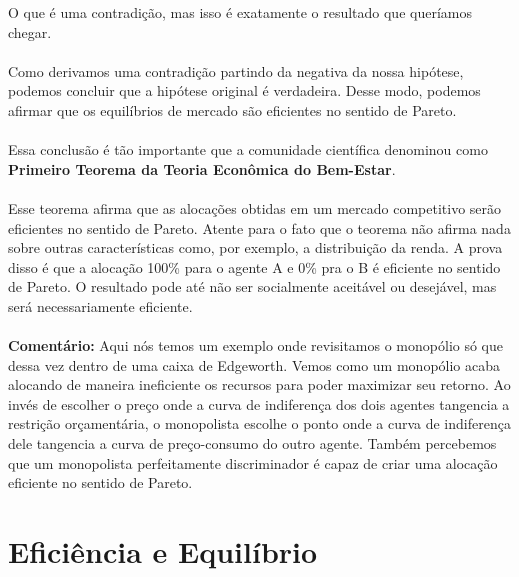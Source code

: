 \documentclass[a4paper,11pt,oneside]{book}
\theoremstyle{definition}
\theoremstyle{break}
\begin{document}
O que é uma contradição, mas isso é exatamente o resultado que queríamos chegar.
\\
\\
Como derivamos uma contradição partindo da negativa da nossa hipótese, podemos concluir que a hipótese original é verdadeira. Desse modo, podemos afirmar que os equilíbrios de mercado são eficientes no sentido de Pareto.
\\
\\
Essa conclusão é tão importante que a comunidade científica denominou como \textbf{Primeiro Teorema da Teoria Econômica do Bem-Estar}.
\\
\\
Esse teorema afirma que as alocações obtidas em um mercado competitivo serão eficientes no sentido de Pareto. Atente para o fato que o teorema não afirma nada sobre outras características como, por exemplo, a distribuição da renda. A prova disso é que a alocação 100\% para o agente A e 0\% pra o B é eficiente no sentido de Pareto. O resultado pode até não ser socialmente aceitável ou desejável, mas será necessariamente eficiente.
\\
\\
\textbf{Comentário:} Aqui nós temos um exemplo onde revisitamos o monopólio só que dessa vez dentro de uma caixa de Edgeworth. Vemos como um monopólio acaba alocando de maneira ineficiente os recursos para poder maximizar seu retorno. Ao invés de escolher o preço onde a curva de indiferença dos dois agentes tangencia a restrição orçamentária, o monopolista escolhe o ponto onde a curva de indiferença dele tangencia a curva de preço-consumo do outro agente. Também percebemos que um monopolista perfeitamente discriminador é capaz de criar uma alocação eficiente no sentido de Pareto.

\section{Eficiência e Equilíbrio}
\end{document}
